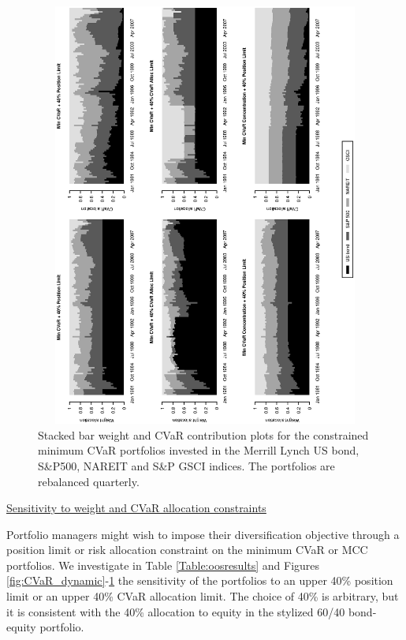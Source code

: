 \documentclass[12pt,a4paper]{article}
\begin{document}
\begin{figure}[tb]
\caption{Stacked bar weight and CVaR contribution plots for the constrained minimum CVaR portfolios invested in the Merrill Lynch US bond, S\&P500, NAREIT and S\&P GSCI indices. The portfolios are rebalanced quarterly.\label{fig:MinCVaR_alternatives}}
\includegraphics[width=12cm,height=14cm,angle=270]{MinCVaR_alternatives_CC.eps}
\end{figure}
\medskip

\underline{Sensitivity to weight and CVaR allocation constraints}


Portfolio managers might wish to impose their diversification objective through a position limit or risk allocation constraint on the minimum CVaR or MCC portfolios. We investigate in Table \ref{Table:oosresults} and Figures \ref{fig:CVaR_dynamic}-\ref{fig:MinCVaR_alternatives} the sensitivity of the portfolios to an upper 40\% position limit or an upper 40\% CVaR allocation limit. The choice of 40\% is arbitrary, but it is consistent with the 40\% allocation to equity in the stylized 60/40 bond-equity portfolio.
\end{document}
